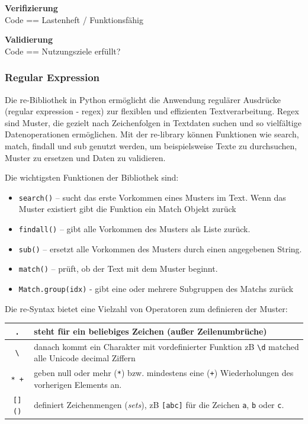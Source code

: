 \documentclass[a4paper, 12pt]{article}
\begin{document}
\textbf{Verifizierung}\\
Code == Lastenheft / Funktionsfähig %

\textbf{Validierung}\\
Code == Nutzungsziele erfüllt? %



\subsubsection{Regular Expression}\label{regularExpression}
Die re-Bibliothek in Python ermöglicht die Anwendung regulärer Ausdrücke (regular expression - regex) zur flexiblen und effizienten Textverarbeitung. Regex sind Muster, die gezielt nach Zeichenfolgen in Textdaten suchen und so vielfältige Datenoperationen ermöglichen. Mit der re-library können Funktionen wie search, match, findall und sub genutzt werden, um beispielsweise Texte zu durchsuchen, Muster zu ersetzen und Daten zu validieren. \cite{regex_lib}

Die wichtigsten Funktionen der Bibliothek sind:
\begin{itemize}
    \item \texttt{search()} – sucht das erste Vorkommen eines Musters im Text. Wenn das Muster existiert gibt die Funktion ein Match Objekt zurück
    \item \texttt{findall()} – gibt alle Vorkommen des Musters als Liste zurück.
    \item \texttt{sub()} – ersetzt alle Vorkommen des Musters durch einen angegebenen String.
    \item \texttt{match()} – prüft, ob der Text mit dem Muster beginnt.
    	\item \texttt{Match.group(idx)} - gibt eine oder mehrere Subgruppen des Matchs zurück
\end{itemize}

\newpage
Die re-Syntax bietet eine Vielzahl von Operatoren zum definieren der Muster:
\begin{table}[h!]
\centering
\begin{tabular}{|c | >{\arraybackslash}p{11cm}|}
\hline
\texttt{.} & steht für ein beliebiges Zeichen (außer Zeilenumbrüche) \\
\hline
\texttt{\textbackslash} & danach kommt ein Charakter mit vordefinierter Funktion zB \texttt{\textbackslash d}  matched
	alle Unicode decimal Ziffern \\
\hline
\texttt{* +} & geben null oder mehr (\texttt{*}) bzw. mindestens 
	eine (\texttt{+}) Wiederholungen des vorherigen Elements an. \\
\hline
\texttt{[] ()} & definiert Zeichenmengen (\textit{sets}), zB \texttt{[abc]} für die Zeichen 	 
	\texttt{a}, \texttt{b} oder \texttt{c}. \\
\hline
\end{tabular}
\end{table}
\end{document}
